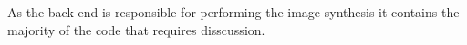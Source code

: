 As the back end is responsible for performing the image synthesis it contains the majority of the code that requires disscussion.

\newpage


